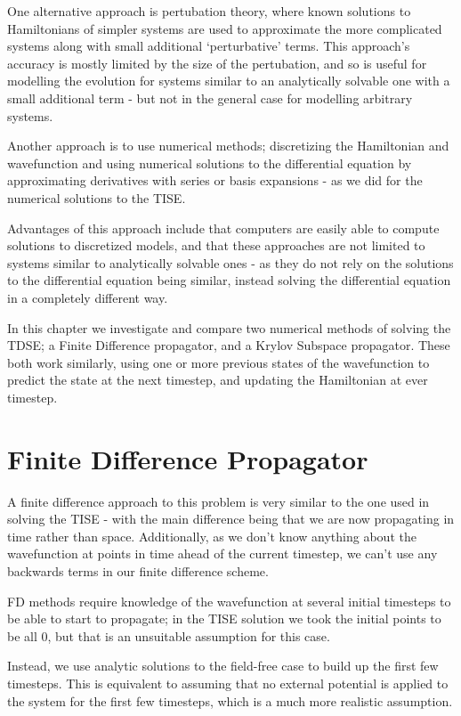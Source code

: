 One alternative approach is pertubation theory, where known solutions to Hamiltonians of simpler systems are used to approximate the more complicated systems along with small additional `perturbative' terms. This approach's accuracy is mostly limited by the size of the pertubation, and so is useful for modelling the evolution for systems similar to an analytically solvable one with a small additional term - but not in the general case for modelling arbitrary systems.

Another approach is to use numerical methods; discretizing the Hamiltonian and wavefunction and using numerical solutions to the differential equation by approximating derivatives with series or basis expansions - as we did for the numerical solutions to the TISE. 

Advantages of this approach include that computers are easily able to compute solutions to discretized models, and that these approaches are not limited to systems similar to analytically solvable ones - as they do not rely on the solutions to the differential equation being similar, instead solving the differential equation in a completely different way.

In this chapter we investigate and compare two numerical methods of solving the TDSE; a Finite Difference propagator, and a Krylov Subspace propagator. These both work similarly, using one or more previous states of the wavefunction to predict the state at the next timestep, and updating the Hamiltonian at ever timestep.

\section{Finite Difference Propagator}
A finite difference approach to this problem is very similar to the one used in solving the TISE - with the main difference being that we are now propagating in time rather than space. Additionally, as we don't know anything about the wavefunction at points in time ahead of the current timestep, we can't use any backwards terms in our finite difference scheme. 

FD methods require knowledge of the wavefunction at several initial timesteps to be able to start to propagate; in the TISE solution we took the initial points to be all $0$, but that is an unsuitable assumption for this case. 

Instead, we use analytic solutions to the field-free case to build up the first few timesteps. This is equivalent to assuming that no external potential is applied to the system for the first few timesteps, which is a much more realistic assumption.

